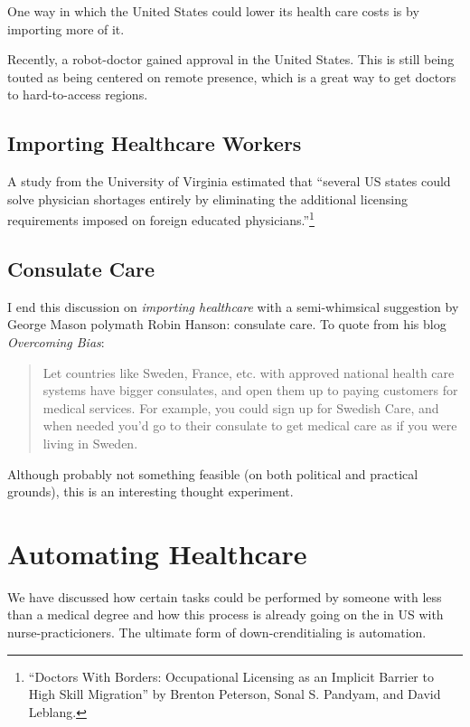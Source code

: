 One way in which the United States could lower its health care costs is by
importing more of it.

Recently, a robot-doctor gained approval in the United States. This is still
being touted as being centered on remote presence, which is a great way to get
doctors to hard-to-access regions.


\subsection{Importing Healthcare Workers}

A study from the University of Virginia estimated that ``several US states
could solve physician shortages entirely by eliminating the additional
licensing requirements imposed on foreign educated
physicians.''\footnote{``Doctors With Borders: Occupational Licensing as an
Implicit Barrier to High Skill Migration'' by Brenton Peterson, Sonal S.
Pandyam, and David Leblang.}

\subsection{Consulate Care}

I end this discussion on \emph{importing healthcare} with a semi-whimsical
suggestion by George Mason polymath Robin Hanson: consulate care. To quote from
his blog \emph{Overcoming Bias}:

\begin{quote}
Let countries like Sweden, France, etc. with approved national health care
systems have bigger consulates, and open them up to paying customers for
medical services. For example, you could sign up for Swedish Care, and when
needed you’d go to their consulate to get medical care as if you were living in
Sweden.
\end{quote}

Although probably not something feasible (on both political and practical
grounds), this is an interesting thought experiment.

\section{Automating Healthcare}

We have discussed how certain tasks could be performed by someone with less
than a medical degree and how this process is already going on the in US with
nurse-practicioners. The ultimate form of down-crenditialing is automation.

